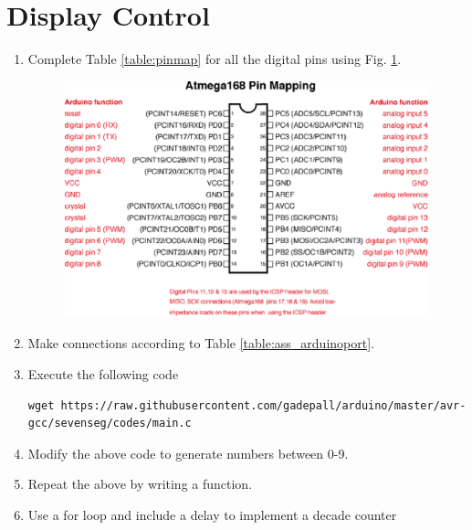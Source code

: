 \documentclass[journal,12pt,twocolumn]{IEEEtran}
\begin{document}
\section{Display Control}
\begin{enumerate}[1.]
\item Complete   Table \ref{table:pinmap} 
for all the digital pins using Fig. \ref{fig:Atmega168PinMap2}.
%

\begin{figure}[!h]
\begin{center}
\includegraphics[width=\columnwidth]{./figs/Atmega168PinMap2}
\end{center}
\caption{}
\label{fig:Atmega168PinMap2}
\end{figure}
%
\item Make connections according to Table \ref{table:ass_arduinoport}.
%
\begin{table}[!ht]
\small
\centering

\caption{}
\label{table:ass_arduinoport}
\end{table}
\item Execute the following code
\begin{lstlisting}
wget https://raw.githubusercontent.com/gadepall/arduino/master/avr-gcc/sevenseg/codes/main.c
\end{lstlisting}
\item Modify the above code to generate numbers between 0-9.
\item Repeat the above by writing a function.
\item Use a for loop and include a delay to implement a decade counter
\end{enumerate}
\end{document}
